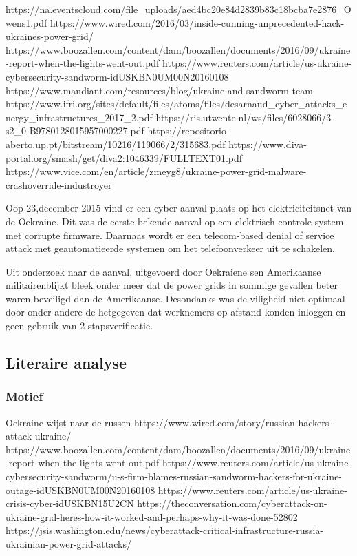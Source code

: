 \documentclass{article}
\begin{document}
	https://na.eventscloud.com/file_uploads/aed4bc20e84d2839b83c18bcba7e2876_Owens1.pdf
	https://www.wired.com/2016/03/inside-cunning-unprecedented-hack-ukraines-power-grid/
	https://www.boozallen.com/content/dam/boozallen/documents/2016/09/ukraine-report-when-the-lights-went-out.pdf
	https://www.reuters.com/article/us-ukraine-cybersecurity-sandworm-idUSKBN0UM00N20160108
	https://www.mandiant.com/resources/blog/ukraine-and-sandworm-team
	https://www.ifri.org/sites/default/files/atoms/files/desarnaud_cyber_attacks_energy_infrastructures_2017_2.pdf
	https://ris.utwente.nl/ws/files/6028066/3-s2_0-B9780128015957000227.pdf
	https://repositorio-aberto.up.pt/bitstream/10216/119066/2/315683.pdf
	https://www.diva-portal.org/smash/get/diva2:1046339/FULLTEXT01.pdf
	https://www.vice.com/en/article/zmeyg8/ukraine-power-grid-malware-crashoverride-industroyer
	
	
	
	Oop 23,december 2015  vind er een cyber aanval plaats op het elektriciteitsnet van de Oekraine. Dit was de eerste bekende aanval op een elektrisch controle  system met corrupte firmware. Daarnaas wordt er een telecom-based denial of service attack met  geautomatieerde systemen om het telefoonverkeer uit te schakelen.
	\cite{Whitehead2017ukrainepoweroutage}
	
	Uit onderzoek\cite{zetter2016GridHack} naar de aanval,  uitgevoerd door Oekraiene sen Amerikaanse militairenblijkt  bleek onder meer dat de power grids in sommige gevallen beter waren beveiligd dan de Amerikaanse. Desondanks was de viligheid niet optimaal door onder andere de  hetgegeven dat werknemers op afstand konden inloggen en geen gebruik van 2-stapsverificatie.
	
	
	\subsection{Literaire analyse}
	
	\subsubsection{Motief}
	Oekraine wijst naar de russen \cite{zetter2016GridHack}
	https://www.wired.com/story/russian-hackers-attack-ukraine/
	https://www.boozallen.com/content/dam/boozallen/documents/2016/09/ukraine-report-when-the-lights-went-out.pdf
	https://www.reuters.com/article/us-ukraine-cybersecurity-sandworm/u-s-firm-blames-russian-sandworm-hackers-for-ukraine-outage-idUSKBN0UM00N20160108
	https://www.reuters.com/article/us-ukraine-crisis-cyber-idUSKBN15U2CN
	https://theconversation.com/cyberattack-on-ukraine-grid-heres-how-it-worked-and-perhaps-why-it-was-done-52802
	https://jsis.washington.edu/news/cyberattack-critical-infrastructure-russia-ukrainian-power-grid-attacks/
\end{document}
